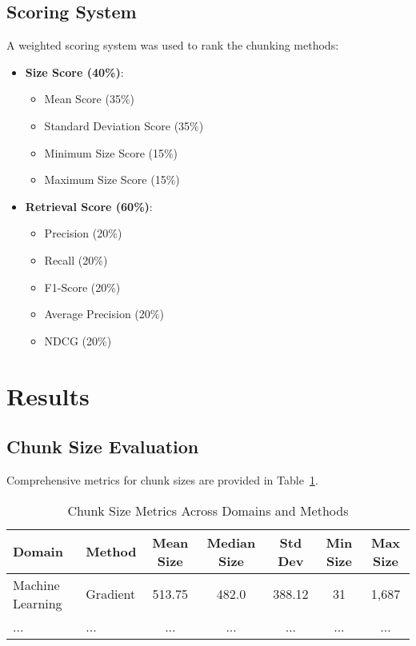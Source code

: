 \documentclass[12pt]{article}
\begin{document}
\subsection{Scoring System}
A weighted scoring system was used to rank the chunking methods:
\begin{itemize}
    \item \textbf{Size Score (40\%)}:
    \begin{itemize}
        \item Mean Score (35\%)
        \item Standard Deviation Score (35\%)
        \item Minimum Size Score (15\%)
        \item Maximum Size Score (15\%)
    \end{itemize}
    \item \textbf{Retrieval Score (60\%)}:
    \begin{itemize}
        \item Precision (20\%)
        \item Recall (20\%)
        \item F1-Score (20\%)
        \item Average Precision (20\%)
        \item NDCG (20\%)
    \end{itemize}
\end{itemize}

\section{Results}
\subsection{Chunk Size Evaluation}
Comprehensive metrics for chunk sizes are provided in Table~\ref{tab:chunk-size}.

\begin{table}[H]
\centering
\caption{Chunk Size Metrics Across Domains and Methods}
\begin{tabular}{|l|l|c|c|c|c|c|}
\hline
Domain & Method & Mean Size & Median Size & Std Dev & Min Size & Max Size \\
\hline
Machine Learning & Gradient & 513.75 & 482.0 & 388.12 & 31 & 1,687 \\
\hline
... & ... & ... & ... & ... & ... & ... \\
\hline
\end{tabular}
\label{tab:chunk-size}
\end{table}
\end{document}

